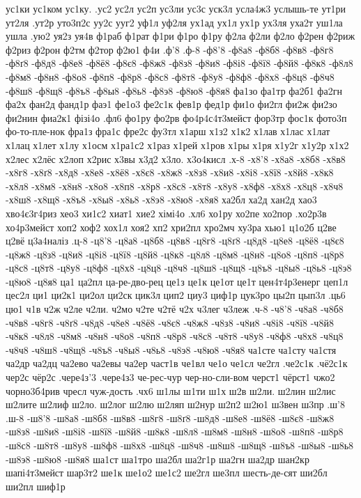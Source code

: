 {{ус1ки
ус1ком
ус1ку.
.ус2
ус2л
ус2п
ус3ли
ус3с
уск3л
усла4ж3
услышь-те
ут1ри
ут2ля
.ут2р
уто3п2с
уу2с
ууг2
уф1л
уф2ля
ух1ад
ух1л
ух1р
ух3ля
уха2т
уш1ла
ушла
.ую2
уя2з
уя4в
ф1раб
ф1рат
ф1ри
ф1ро
ф1ру
ф2ла
ф2ли
ф2ло
ф2рен
ф2риж
ф2риз
ф2рон
ф2тм
ф2тор
ф2ю1
ф4и
.ф'8
.ф-8
-ф8'8
-ф8а8
-ф8б8
-ф8в8
-ф8г8
-ф8ґ8
-ф8д8
-ф8е8
-ф8ё8
-ф8є8
-ф8ж8
-ф8з8
-ф8и8
-ф8і8
-ф8ї8
-ф8й8
-ф8к8
-ф8л8
-ф8м8
-ф8н8
-ф8о8
-ф8п8
-ф8р8
-ф8с8
-ф8т8
-ф8у8
-ф8ф8
-ф8х8
-ф8ц8
-ф8ч8
-ф8ш8
-ф8щ8
-ф8ъ8
-ф8ы8
-ф8ь8
-ф8э8
-ф8ю8
-ф8я8
фа1зо
фа1тр
фа2б1
фа2гн
фа2х
фан2д
фанд1р
фаэ1
фе1о3
фе2с1к
фев1р
фед1р
фи1о
фи2гл
фи2ж
фи2зо
фи2нин
фиа2к1
фізі4о
.фл6
фо1ру
фо2рв
фо4р4с4т3мейст
фор3тр
фос1к
фото3п
фо-то-пле-нок
фра1з
фра1с
фре2с
фу3тл
х1арш
х1з2
х1к2
х1лав
х1лас
х1лат
х1лац
х1лет
х1лу
х1осм
х1ра1с2
х1раз
х1рей
х1ров
х1ры
х1ря
х1у2г
х1у2р
х1х2
х2лес
х2лёс
х2лоп
х2рис
х3вы
х3д2
х3ло.
х3о4кисл
.х-8
-х8'8
-х8а8
-х8б8
-х8в8
-х8г8
-х8ґ8
-х8д8
-х8е8
-х8ё8
-х8є8
-х8ж8
-х8з8
-х8и8
-х8і8
-х8ї8
-х8й8
-х8к8
-х8л8
-х8м8
-х8н8
-х8о8
-х8п8
-х8р8
-х8с8
-х8т8
-х8у8
-х8ф8
-х8х8
-х8ц8
-х8ч8
-х8ш8
-х8щ8
-х8ъ8
-х8ы8
-х8ь8
-х8э8
-х8ю8
-х8я8
ха2бл
ха2д
хан2д
хао3
хво4є3г4риз
хео3
хи1с2
хиат1
хие2
хімі4о
.хл6
хо1ру
хо2пе
хо2пор
.хо2р3в
хо4р3мейст
хоп2
хоф2
хох1л
хоя2
хп2
хри2пл
хро2мч
ху3ра
хью1
ц1о2б
ц2ве
ц2вё
ц3а4наліз
.ц-8
-ц8'8
-ц8а8
-ц8б8
-ц8в8
-ц8г8
-ц8ґ8
-ц8д8
-ц8е8
-ц8ё8
-ц8є8
-ц8ж8
-ц8з8
-ц8и8
-ц8і8
-ц8ї8
-ц8й8
-ц8к8
-ц8л8
-ц8м8
-ц8н8
-ц8о8
-ц8п8
-ц8р8
-ц8с8
-ц8т8
-ц8у8
-ц8ф8
-ц8х8
-ц8ц8
-ц8ч8
-ц8ш8
-ц8щ8
-ц8ъ8
-ц8ы8
-ц8ь8
-ц8э8
-ц8ю8
-ц8я8
ца1
ца2пл
ца-ре-дво-рец
це1з
це1к
це1от
це1т
цен4т4р3енерг
цеп1л
цес2л
ци1
ци2к1
ци2ол
ци2ск
цик3л
цип2
циу3
циф1р
цук3ро
цы2п
цып3л
.ць6
цю1
ч1в
ч2ж
ч2ле
ч2ли.
ч2мо
ч2те
ч2тё
ч2х
ч3лег
ч3леж
.ч-8
-ч8'8
-ч8а8
-ч8б8
-ч8в8
-ч8г8
-ч8ґ8
-ч8д8
-ч8е8
-ч8ё8
-ч8є8
-ч8ж8
-ч8з8
-ч8и8
-ч8і8
-ч8ї8
-ч8й8
-ч8к8
-ч8л8
-ч8м8
-ч8н8
-ч8о8
-ч8п8
-ч8р8
-ч8с8
-ч8т8
-ч8у8
-ч8ф8
-ч8х8
-ч8ц8
-ч8ч8
-ч8ш8
-ч8щ8
-ч8ъ8
-ч8ы8
-ч8ь8
-ч8э8
-ч8ю8
-ч8я8
ча1сте
ча1сту
ча1стя
ча2др
ча2дц
ча2ево
ча2евы
ча2ер
част1в
че1вл
че1о
че1сл
че2гл
.че2с1к
.чё2с1к
чер2с
чёр2с
.чере4з'3
.чере4з3
че-рес-чур
чер-но-сли-вом
черст1
чёрст1
чжо2
чорно3б4рив
чресл
чуж-дость
.чх6
ш1лы
ш1ти
ш1х
ш2в
ш2ли.
ш2лин
ш2лис
ш2лите
ш2лиф
ш2ло.
ш2лог
ш2лю
ш2ляп
ш2нур
ш2п2
ш2ю1
ш3вен
ш3пр
.ш'8
.ш-8
-ш8'8
-ш8а8
-ш8б8
-ш8в8
-ш8г8
-ш8ґ8
-ш8д8
-ш8е8
-ш8ё8
-ш8є8
-ш8ж8
-ш8з8
-ш8и8
-ш8і8
-ш8ї8
-ш8й8
-ш8к8
-ш8л8
-ш8м8
-ш8н8
-ш8о8
-ш8п8
-ш8р8
-ш8с8
-ш8т8
-ш8у8
-ш8ф8
-ш8х8
-ш8ц8
-ш8ч8
-ш8ш8
-ш8щ8
-ш8ъ8
-ш8ы8
-ш8ь8
-ш8э8
-ш8ю8
-ш8я8
ша1ст
ша1тро
ша2бл
ша2г1р
ша2гн
ша2др
шан2кр
шапі4т3мейст
шар3т2
ше1к
ше1о2
ше1с2
ше2гл
ше3пл
шесть-де-сят
ши2бл
ши2пл
шиф1р
}}
